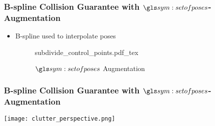 \begin{frame}
	\frametitle{B-spline Collision Guarantee with $\setofposes$-Augmentation}

	\begin{itemize}
		\item B-spline used to interpolate poses
		\begin{figure}[hbt]
			\centering
			\def\svgwidth{0.7\columnwidth}
			{subdivide_control_points.pdf_tex}
			\caption{$\setofposes$ Augmentation}%
			\label{fig:set_of_poses_augmentation}
		\end{figure}
	\end{itemize}
\end{frame}

\begin{frame}
	\frametitle{B-spline Collision Guarantee with $\setofposes$-Augmentation}
	\begin{center}
		\texttt{[image: clutter\_perspective.png]}
	\end{center}
\end{frame}


